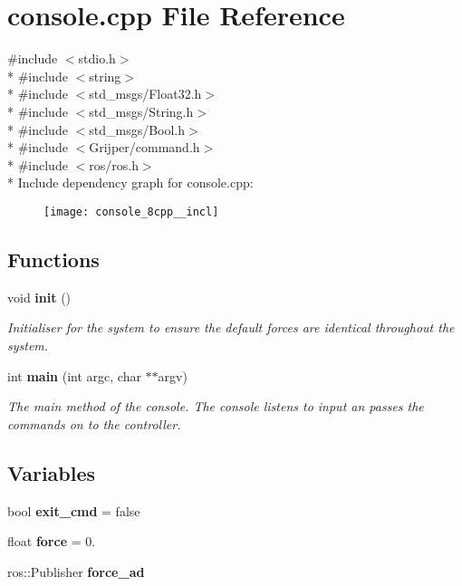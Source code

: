 \section{console.\-cpp File Reference}
\label{console_8cpp}
{\ttfamily \#include $<$stdio.\-h$>$}\\*
{\ttfamily \#include $<$string$>$}\\*
{\ttfamily \#include $<$std\-\_\-msgs/\-Float32.\-h$>$}\\*
{\ttfamily \#include $<$std\-\_\-msgs/\-String.\-h$>$}\\*
{\ttfamily \#include $<$std\-\_\-msgs/\-Bool.\-h$>$}\\*
{\ttfamily \#include $<$Grijper/command.\-h$>$}\\*
{\ttfamily \#include $<$ros/ros.\-h$>$}\\*
Include dependency graph for console.\-cpp\-:\nopagebreak
\begin{figure}[H]
\begin{center}
\leavevmode
\texttt{[image: console\_8cpp\_\_incl]}
\end{center}
\end{figure}
\subsection*{Functions}
\begin{DoxyCompactItemize}
\item 
void {\bf init} ()
\begin{DoxyCompactList}\small\item\em Initialiser for the system to ensure the default forces are identical throughout the system. \end{DoxyCompactList}\item 
int {\bf main} (int argc, char $\ast$$\ast$argv)
\begin{DoxyCompactList}\small\item\em The main method of the console. The console listens to input an passes the commands on to the controller. \end{DoxyCompactList}\end{DoxyCompactItemize}
\subsection*{Variables}
\begin{DoxyCompactItemize}
\item 
bool {\bf exit\-\_\-cmd} = false
\item 
float {\bf force} = 0.
\item 
ros\-::\-Publisher {\bf force\-\_\-ad}
\end{DoxyCompactItemize}


